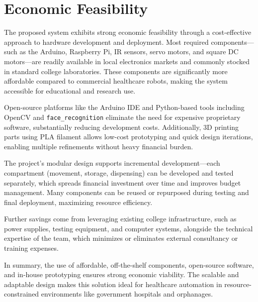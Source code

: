 \section{Economic Feasibility}

The proposed system exhibits strong economic feasibility through a cost-effective approach to hardware development and deployment. Most required components—such as the Arduino, Raspberry Pi, IR sensors, servo motors, and square DC motors—are readily available in local electronics markets and commonly stocked in standard college laboratories. These components are significantly more affordable compared to commercial healthcare robots, making the system accessible for educational and research use.

Open-source platforms like the Arduino IDE and Python-based tools including OpenCV and \texttt{face\_recognition} eliminate the need for expensive proprietary software, substantially reducing development costs. Additionally, 3D printing parts using PLA filament allows low-cost prototyping and quick design iterations, enabling multiple refinements without heavy financial burden.

The project’s modular design supports incremental development—each compartment (movement, storage, dispensing) can be developed and tested separately, which spreads financial investment over time and improves budget management. Many components can be reused or repurposed during testing and final deployment, maximizing resource efficiency.

Further savings come from leveraging existing college infrastructure, such as power supplies, testing equipment, and computer systems, alongside the technical expertise of the team, which minimizes or eliminates external consultancy or training expenses.

In summary, the use of affordable, off-the-shelf components, open-source software, and in-house prototyping ensures strong economic viability. The scalable and adaptable design makes this solution ideal for healthcare automation in resource-constrained environments like government hospitals and orphanages.
